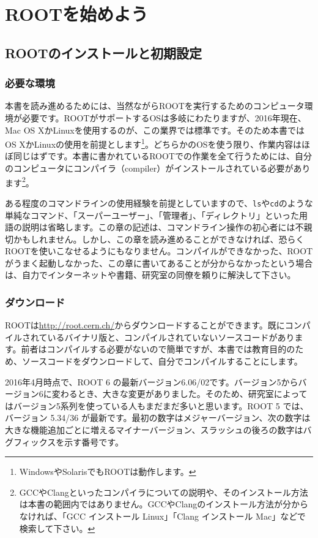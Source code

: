 \chapter{ROOTを始めよう}
\label{chapter_Install}
\section{ROOTのインストールと初期設定}
\label{sec_ROOT_install}
\subsection{必要な環境}
本書を読み進めるためには、当然ながらROOTを実行するためのコンピュータ環境が必要です。ROOTがサポートするOSは多岐にわたりますが、2016年現在、Mac OS XかLinuxを使用するのが、この業界では標準です。そのため本書ではOS XかLinuxの使用を前提とします\footnote{WindowsやSolarisでもROOTは動作します。}。どちらかのOSを使う限り、作業内容はほぼ同じはずです。本書に書かれているROOTでの作業を全て行うためには、自分のコンピュータにコンパイラ（compiler）がインストールされている必要があります\footnote{GCCやClangといったコンパイラについての説明や、そのインストール方法は本書の範囲内ではありません。GCCやClangのインストール方法が分からなければ、「GCC インストール Linux」「Clang インストール Mac」などで検索して下さい。}。

ある程度のコマンドラインの使用経験を前提としていますので、\texttt{ls}や\texttt{cd}のような単純なコマンド、「スーパーユーザー」、「管理者」、「ディレクトリ」といった用語の説明は省略します。この章の記述は、コマンドライン操作の初心者には不親切かもしれません。しかし、この章を読み進めることができなければ、恐らくROOTを使いこなせるようにもなりません。コンパイルができなかった、ROOTがうまく起動しなかった、この章に書いてあることが分からなかったという場合は、自力でインターネットや書籍、研究室の同僚を頼りに解決して下さい。

\subsection{ダウンロード}
\label{subsec_download}
ROOTは\url{http://root.cern.ch/}からダウンロードすることができます。既にコンパイルされているバイナリ版と、コンパイルされていないソースコードがあります。前者はコンパイルする必要がないので簡単ですが、本書では教育目的のため、ソースコードをダウンロードして、自分でコンパイルすることにします。

2016年4月時点で、ROOT 6 の最新バージョン6.06/02です。バージョン5からバージョン6に変わるとき、大きな変更がありました。そのため、研究室によってはバージョン5系列を使っている人もまだまだ多いと思います。ROOT 5 では、バージョン 5.34/36 が最新です。最初の数字はメジャーバージョン、次の数字は大きな機能追加ごとに増えるマイナーバージョン、スラッシュの後ろの数字はバグフィックスを示す番号です。


